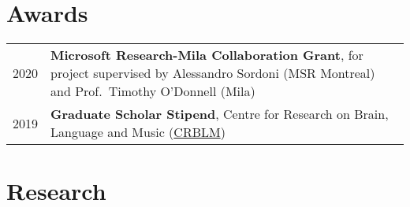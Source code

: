 \documentclass[11pt,a4paper]{article}
\begin{document}
  \section{Awards}
  \begin{longtable}{p{1.7cm}|p{15cm}}
    \textsc{2020}&%
      \textbf{Microsoft Research-Mila Collaboration Grant}, for project
      supervised by Alessandro Sordoni (MSR Montreal) and Prof.\ Timothy
      O'Donnell (Mila)\\
    \textsc{2019}&%
      \textbf{Graduate Scholar Stipend}, Centre for Research on Brain, Language
      and Music (\href{https://crblm.ca/}{CRBLM})\\
  \end{longtable}

  \section{Research}

  \vspace{5pt}
  \nocite{hoover.j:2021,hoover.j:2020}
  \AtNextBibliography{\small}
  \printbibliography[heading=none]{}
  \vspace{5pt}

\end{document}
